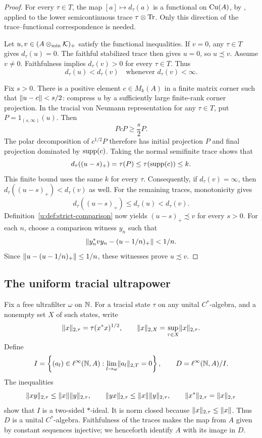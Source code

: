 \begin{proof}
For every $\tau\in T$, the map $[a]\mapsto d_\tau(a)$ is a
functional on $\operatorname{Cu}(A)$, by \cite[Proposition~4.2]{ERS}, applied to
the lower semicontinuous trace $\tau\otimes\operatorname{Tr}$. Only this direction
of the trace--functional correspondence is needed.

Let $u,v\in(A\otimes_{\min}\mathcal K)_+$ satisfy the functional
inequalities. If $v=0$, any $\tau\in T$ gives $d_\tau(u)=0$.
The faithful stabilized trace then gives $u=0$, so $u\precsim v$.
Assume $v\ne0$. Faithfulness implies $d_\tau(v)>0$ for every
$\tau\in T$. Thus
\[
 d_\tau(u)<d_\tau(v)
 \quad\text{whenever }d_\tau(v)<\infty.
\]

Fix $s>0$. There is a positive element $c\in M_k(A)$ in a finite
matrix corner such that $\lVert u-c\rVert<s/2$: compress $u$ by a
sufficiently large finite-rank corner projection. In the tracial
von Neumann representation for any $\tau\in T$, put
$P=1_{(s,\infty)}(u)$. Then
\[
 PcP\ge\frac{s}{2}P.
\]
The polar decomposition of $c^{1/2}P$ therefore has initial
projection $P$ and final projection dominated by $\operatorname{supp}(c)$.
Taking the normal semifinite trace shows that
\[
 d_\tau((u-s)_+)=\tau(P)\le\tau(\operatorname{supp}(c))\le k.
\]
This finite bound uses the same $k$ for every $\tau$. Consequently,
if $d_\tau(v)=\infty$, then
$d_\tau((u-s)_+)<d_\tau(v)$ as well. For the remaining traces,
monotonicity gives
\[
 d_\tau((u-s)_+)\le d_\tau(u)<d_\tau(v).
\]
Definition~\ref{u:def:strict-comparison} now yields
$(u-s)_+\precsim v$ for every $s>0$. For each $n$, choose a
comparison witness $y_n$ such that
\[
 \lVert y_n^*vy_n-(u-1/n)_+\rVert<1/n.
\]
Since $\lVert u-(u-1/n)_+\rVert\le1/n$, these witnesses prove
$u\precsim v$.
\end{proof}

\subsection{The uniform tracial ultrapower}

Fix a free ultrafilter $\omega$ on $\mathbb N$. For a tracial state
$\tau$ on any unital $C^*$-algebra, and a nonempty set $X$ of such
states, write
\[
 \lVert x\rVert_{2,\tau}=\tau(x^*x)^{1/2},\qquad
 \lVert x\rVert_{2,X}=\sup_{\tau\in X}\lVert x\rVert_{2,\tau}.
\]
Define
\[
 I=\left\{(a_l)\in\ell^\infty(\mathbb N,A):
             \lim_{l\to\omega}\lVert a_l\rVert_{2,T}=0\right\},
 \qquad D=\ell^\infty(\mathbb N,A)/I.
\]
The inequalities
\[
 \lVert xy\rVert_{2,\tau}\le\lVert x\rVert\lVert y\rVert_{2,\tau},
 \qquad
 \lVert yx\rVert_{2,\tau}\le\lVert x\rVert\lVert y\rVert_{2,\tau},
 \qquad
 \lVert x^*\rVert_{2,\tau}=\lVert x\rVert_{2,\tau}
\]
show that $I$ is a two-sided $*$-ideal. It is norm closed because
$\lVert x\rVert_{2,\tau}\le\lVert x\rVert$. Thus $D$ is a unital $C^*$-algebra.
Faithfulness of the traces makes the map from $A$ given by constant
sequences injective; we henceforth identify $A$ with its image in $D$.

